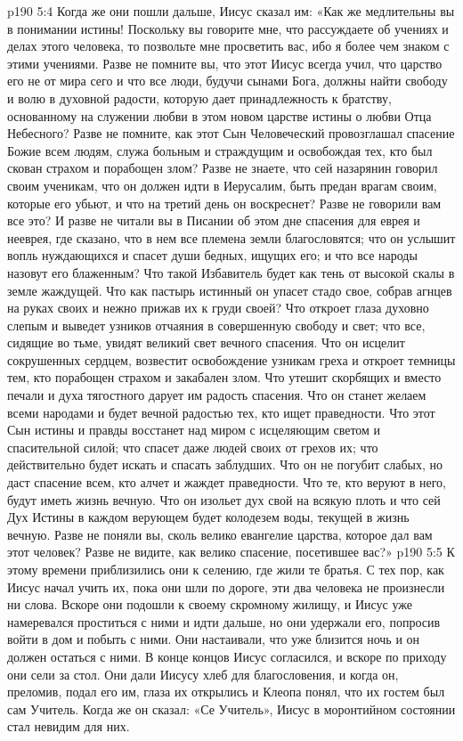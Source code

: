 \vs p190 5:4 Когда же они пошли дальше, Иисус сказал им: «Как же медлительны вы в понимании истины! Поскольку вы говорите мне, что рассуждаете об учениях и делах этого человека, то позвольте мне просветить вас, ибо я более чем знаком с этими учениями. Разве не помните вы, что этот Иисус всегда учил, что царство его не от мира сего и что все люди, будучи сынами Бога, должны найти свободу и волю в духовной радости, которую дает принадлежность к братству, основанному на служении любви в этом новом царстве истины о любви Отца Небесного? Разве не помните, как этот Сын Человеческий провозглашал спасение Божие всем людям, служа больным и страждущим и освобождая тех, кто был скован страхом и порабощен злом? Разве не знаете, что сей назарянин говорил своим ученикам, что он должен идти в Иерусалим, быть предан врагам своим, которые его убьют, и что на третий день он воскреснет? Разве не говорили вам все это? И разве не читали вы в Писании об этом дне спасения для еврея и нееврея, где сказано, что в нем все племена земли благословятся; что он услышит вопль нуждающихся и спасет души бедных, ищущих его; и что все народы назовут его блаженным? Что такой Избавитель будет как тень от высокой скалы в земле жаждущей. Что как пастырь истинный он упасет стадо свое, собрав агнцев на руках своих и нежно прижав их к груди своей? Что откроет глаза духовно слепым и выведет узников отчаяния в совершенную свободу и свет; что все, сидящие во тьме, увидят великий свет вечного спасения. Что он исцелит сокрушенных сердцем, возвестит освобождение узникам греха и откроет темницы тем, кто порабощен страхом и закабален злом. Что утешит скорбящих и вместо печали и духа тягостного дарует им радость спасения. Что он станет желаем всеми народами и будет вечной радостью тех, кто ищет праведности. Что этот Сын истины и правды восстанет над миром с исцеляющим светом и спасительной силой; что спасет даже людей своих от грехов их; что действительно будет искать и спасать заблудших. Что он не погубит слабых, но даст спасение всем, кто алчет и жаждет праведности. Что те, кто веруют в него, будут иметь жизнь вечную. Что он изольет дух свой на всякую плоть и что сей Дух Истины в каждом верующем будет колодезем воды, текущей в жизнь вечную. Разве не поняли вы, сколь велико евангелие царства, которое дал вам этот человек? Разве не видите, как велико спасение, посетившее вас?»
\vs p190 5:5 К этому времени приблизились они к селению, где жили те братья. С тех пор, как Иисус начал учить их, пока они шли по дороге, эти два человека не произнесли ни слова. Вскоре они подошли к своему скромному жилищу, и Иисус уже намеревался проститься с ними и идти дальше, но они удержали его, попросив войти в дом и побыть с ними. Они настаивали, что уже близится ночь и он должен остаться с ними. В конце концов Иисус согласился, и вскоре по приходу они сели за стол. Они дали Иисусу хлеб для благословения, и когда он, преломив, подал его им, глаза их открылись и Клеопа понял, что их гостем был сам Учитель. Когда же он сказал: «Се Учитель», Иисус в моронтийном состоянии стал невидим для них.
